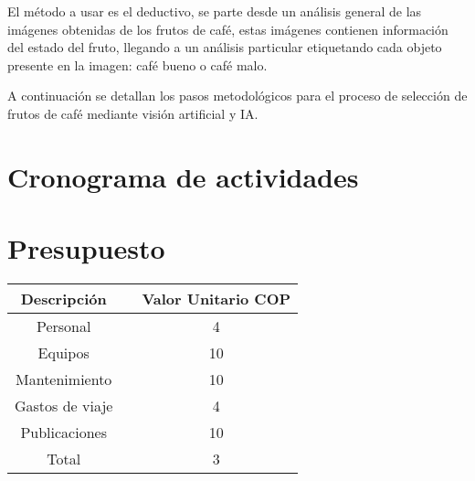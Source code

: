 El método a usar es el deductivo, se parte desde un análisis general de las imágenes obtenidas de los frutos de café, estas imágenes contienen información del estado del fruto, llegando a un análisis particular etiquetando cada objeto presente en la imagen: café bueno o café malo.\medskip

A continuación se detallan los pasos metodológicos para el proceso de selección de frutos de café mediante visión artificial y IA. 



\section{Cronograma de actividades}

\newpage

\section{Presupuesto}

\begin{center}

\begin{tabular}{| c | c | c |}
\hline
Descripción  &  & Valor Unitario COP \\ \hline
Personal &  & 4 \\
Equipos &  & 10 \\
Mantenimiento &  & 10 \\
Gastos de viaje &  & 4 \\
Publicaciones &  & 10 \\
Total &  & 3 \\ \hline
\end{tabular}

\end{center}